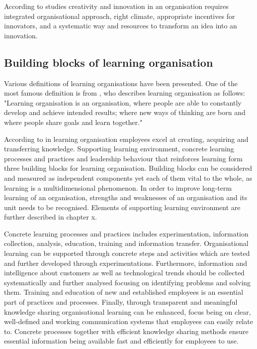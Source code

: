 According to studies creativity and innovation in an organisation requires integrated organisational approach, right climate, appropriate incentives for innovators, and a systematic way and resources to transform an idea into an innovation. \citep{roffe1999innovation} 

\subsection{Building blocks of learning organisation}
Various definitions of learning organisations have been presented. One of the most famous definition is from \citet{senge1990fifth}, who describes learning organisation as follows: "Learning organisation is an organisation, where people are able to constantly develop and achieve intended results; where new ways of thinking are born and where people share goals and learn together."

According to \citet{garvin2008yours} in learning organisation employees excel at creating, acquiring and transferring knowledge. Supporting learning environment, concrete learning processes and practices and leadership behaviour that reinforces learning form three building blocks for learning organisation. Building blocks can be considered and measured as independent components yet each of them vital to the whole, as learning is a multidimensional phenomenon. In order to improve long-term learning of an organisation, strengths and weaknesses of an organisation and its unit needs to be recognised. \citep{garvin2008yours} Elements of supporting learning environment are further described in chapter x. 

Concrete learning processes and practices includes experimentation, information collection, analysis, education, training and information transfer. Organisational learning can be supported through concrete steps and activities which are tested and further developed through experimentations. Furthermore, information and intelligence about customers as well as technological trends should be collected systematically and further analysed focusing on identifying problems and solving them. Training and education of new and established employees is an essential part of practices and processes. Finally, through transparent and meaningful knowledge sharing organisational learning can be enhanced, focus being on clear, well-defined and working communication systems that employees can easily relate to. Concrete processes together with efficient knowledge sharing methods ensure essential information being available fast and efficiently for employees to use. \citep{garvin2008yours}

